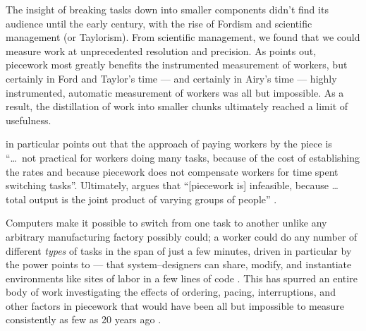 \documentclass[trackingWork]{subfiles}
\begin{document}
The insight of breaking tasks down into smaller components didn't find its audience until
the early  century,
with the rise of Fordism and scientific management (or Taylorism).
From scientific management, we found that
we could measure work at unprecedented resolution and precision.
As \citeauthor{Brown01041990} points out,
piecework most greatly benefits the instrumented measurement of workers, but certainly
in Ford and Taylor's time --- and certainly in Airy's time ---
highly instrumented, automatic measurement of workers was all but impossible.
As a result,
the distillation of work into smaller chunks
ultimately reached a limit of usefulness.

\citeauthor{bewley1999wages} in particular points out that
the approach of paying workers by the piece is
``\dots~not practical for workers doing many tasks, because of
the cost of establishing the rates and because
piecework does not compensate workers for time spent switching tasks''.
Ultimately, \citeauthor{bewley1999wages} argues that
``[piecework is] infeasible, because \dots
total output is the joint product of varying groups of people''
\cite{bewley1999wages}.


\subsubsubsection{\whatchanged}
 Computers make it possible to switch from one task to another
unlike any arbitrary manufacturing factory possibly could;
a worker could do any number of
different \textit{types} of tasks in the span of just a few minutes,
driven in particular by the power \citeauthor{lessig2006code} points to ---
that system--designers can share, modify, and instantiate environments
like sites of labor in a few lines of code
\cite{delayAndOrderLasecki,lessig2006code}.
This has spurred an entire body of work investigating the effects of
ordering,
pacing,
interruptions, and
other factors in piecework that would have been
all but impossible to measure consistently as few as 20 years ago
\cite{cheng2015break,measuringCrowdsourcingCheng,embracingErrorKrishna}.
 
\end{document}
